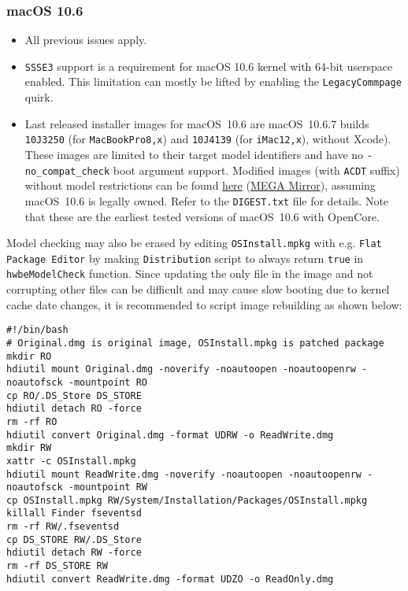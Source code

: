 \documentclass[]{article}
\begin{document}
\subsubsection{macOS 10.6}\label{legacy106}

\begin{itemize}
  \item All previous issues apply.
  \item \texttt{SSSE3} support is a requirement for macOS 10.6 kernel
    with 64-bit userspace enabled. This limitation can mostly be lifted
    by enabling the \texttt{LegacyCommpage} quirk.
  \item Last released installer images for macOS~10.6 are macOS~10.6.7
    builds \texttt{10J3250} (for \texttt{MacBookPro8,x}) and
    \texttt{10J4139} (for \texttt{iMac12,x}), without Xcode). These
    images are limited to their target model identifiers and have no
    \texttt{-no\_compat\_check} boot argument support. Modified images
    (with \texttt{ACDT} suffix) without model restrictions can be found
    \href{https://archive.org/details/10.6.7-10j3250-disk-images}{here}
    (\href{https://mega.nz/folder/z5YUhYTb#gA\_IRY5KMuYpnNCg7kR3ug}{MEGA Mirror}),
    assuming macOS~10.6 is legally owned. Refer to the \texttt{DIGEST.txt} file
    for details. Note that these are the earliest tested
    versions of macOS~10.6 with OpenCore.
\end{itemize}

  Model checking may also be erased by editing \texttt{OSInstall.mpkg}
  with e.g. \texttt{Flat Package Editor} by making \texttt{Distribution}
  script to always return \texttt{true} in \texttt{hwbeModelCheck} function.
  Since updating the only file in the image and not corrupting other files
  can be difficult and may cause slow booting due to kernel cache date
  changes, it is recommended to script image rebuilding as shown below:

\begin{lstlisting}[label=snowrebuild, style=ocbash]
#!/bin/bash
# Original.dmg is original image, OSInstall.mpkg is patched package
mkdir RO
hdiutil mount Original.dmg -noverify -noautoopen -noautoopenrw -noautofsck -mountpoint RO
cp RO/.DS_Store DS_STORE
hdiutil detach RO -force
rm -rf RO
hdiutil convert Original.dmg -format UDRW -o ReadWrite.dmg
mkdir RW
xattr -c OSInstall.mpkg
hdiutil mount ReadWrite.dmg -noverify -noautoopen -noautoopenrw -noautofsck -mountpoint RW
cp OSInstall.mpkg RW/System/Installation/Packages/OSInstall.mpkg
killall Finder fseventsd
rm -rf RW/.fseventsd
cp DS_STORE RW/.DS_Store
hdiutil detach RW -force
rm -rf DS_STORE RW
hdiutil convert ReadWrite.dmg -format UDZO -o ReadOnly.dmg
\end{lstlisting}
\end{document}
